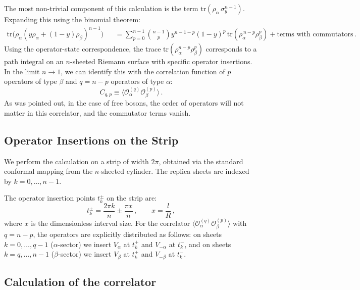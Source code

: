 \documentclass[11pt]{article}
\newcommand{\tr}{\mathrm{tr}}
\begin{document}
The most non-trivial component of this calculation is the term $\tr(\rho_\alpha\,\sigma_y^{n-1})$. Expanding this using the binomial theorem:
\begin{eqnarray}
\tr\!\big(\rho_\alpha (y\rho_\alpha+(1-y)\rho_\beta)^{n-1}\big)
&&= \sum_{p=0}^{n-1} \binom{n-1}{p} y^{n-1-p}(1-y)^p\,
\tr(\rho_{\alpha}^{\,n-p} \rho_{\beta}^p)
+\text{terms with commutators}\,.
\label{eq:binomial-expansion}
\end{eqnarray}
Using the operator-state correspondence, the trace $\tr(\rho_{\alpha}^{n-p} \rho_{\beta}^p)$ corresponds to a path integral on an $n$-sheeted Riemann surface with specific operator insertions. In the limit $n \to 1$, we can identify this with the correlation function of $p$ operators of type $\beta$ and $q=n-p$ operators of type $\alpha$:
\begin{equation}\label{fullcorr}
C_{q,p} \equiv \langle \mathcal{O}_{\alpha}^{(q)} \mathcal{O}_{\beta}^{(p)} \rangle\,.
\end{equation}
As was pointed out, in the case of free bosons, the order of operators will not matter in this correlator, and the commutator terms vanish.

\subsection*{Operator Insertions on the Strip}

We perform the calculation on a strip of width $2\pi$, obtained via the standard conformal mapping from the $n$-sheeted cylinder. The replica sheets are indexed by $k = 0, \dots, n-1$.

The operator insertion points $t_k^{\pm}$ on the strip are:
\begin{equation}
t_k^{\pm} = \frac{2\pi k}{n} \pm \frac{\pi x}{n}\,,
\qquad x = \frac{l}{R}\,,
\end{equation}
where $x$ is the dimensionless interval size. For the correlator $\langle \mathcal{O}_{\alpha}^{(q)} \mathcal{O}_{\beta}^{(p)} \rangle$ with $q=n-p$, the operators are explicitly distributed as follows:
on sheets $k=0, \dots, q-1$ ($\alpha$-sector) we insert $V_{\alpha}$ at $t_k^+$ and $V_{-\alpha}$ at $t_k^-$, and on sheets $k=q, \dots, n-1$ ($\beta$-sector) we insert $V_{\beta}$ at $t_k^+$ and $V_{-\beta}$ at $t_k^-$.

\subsection*{Calculation of the correlator}
\end{document}

